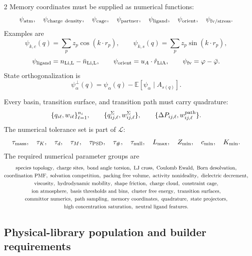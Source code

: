 \documentclass[10pt]{article}
\begin{document}
\begin{multicols}{2}
Memory coordinates must be supplied as numerical functions:
\[
\psi_{\rm atm},\quad
\psi_{\rm charge\ density},\quad
\psi_{\rm cage},\quad
\psi_{\rm partner},\quad
\psi_{\rm ligand},\quad
\psi_{\rm orient},\quad
\psi_{\rm fv/stress}.
\]
Examples are
\[
\psi_{k,c}(q)=\sum_pz_p\cos(k\cdot r_p),
\qquad
\psi_{k,s}(q)=\sum_pz_p\sin(k\cdot r_p),
\]
\[
\psi_{\rm ligand}=n_{\rm Li,L}-\bar n_{\rm Li,L},
\qquad
\psi_{\rm orient}=u_A\cdot\hat r_{\rm LiA},
\qquad
\psi_{\rm fv}=\varphi-\bar\varphi.
\]
State orthogonalization is
\[
\psi_\alpha^\perp(q)
=
\psi_\alpha(q)-\mathbb E[\psi_\alpha\mid A_{s(q)}].
\]

Every basin, transition surface, and transition path must carry quadrature:
\[
\{q_{i\ell},w_{i\ell}\}_{\ell=1}^{n_i},
\qquad
\{q_{ij,\ell}^{\Sigma},w_{ij,\ell}^{\Sigma}\},
\qquad
\{\Delta P_{ij,\ell},w_{ij,\ell}^{\rm path}\}.
\]
The numerical tolerance set is part of \(\mathcal L\):
\[
\tau_{\rm mass},\quad \tau_K,\quad \tau_d,\quad \tau_M,\quad
\tau_{\rm PSD},\quad \tau_\#,\quad \tau_{\rm null},\quad
L_{\max},\quad Z_{\min},\quad c_{\min},\quad K_{\min}.
\]
The required numerical parameter groups are
\[
\begin{gathered}
{\rm species\ topology},\ {\rm charge\ sites},\
{\rm bond\ angle\ torsion},\
{\rm LJ\ cross},\
{\rm Coulomb\ Ewald},\
{\rm Born\ desolvation},\\
{\rm coordination\ PMF},\
{\rm solvation\ competition},\
{\rm packing\ free\ volume},\
{\rm activity\ nonideality},\
{\rm dielectric\ decrement},\\
{\rm viscosity},\
{\rm hydrodynamic\ mobility},\
{\rm shape\ friction},\
{\rm charge\ cloud},\
{\rm constraint\ cage},\\
{\rm ion\ atmosphere},\
{\rm basis\ thresholds\ and\ bins},\
{\rm cluster\ free\ energy},\
{\rm transition\ surfaces},\\
{\rm committor\ numerics},\
{\rm path\ sampling},\
{\rm memory\ coordinates},\
{\rm quadrature},\
{\rm state\ projectors},\\
{\rm high\ concentration\ saturation},\
{\rm neutral\ ligand\ features}.
\end{gathered}
\]

\subsection{Physical-library population and builder requirements}


\end{multicols}
\end{document}
